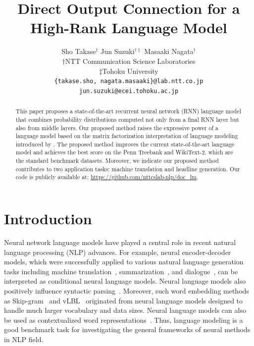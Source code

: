 \documentclass[11pt,a4paper]{article}
\title{Direct Output Connection for a High-Rank Language Model}
\author{Sho Takase$^\dagger$ \hspace{1.5em} Jun Suzuki$^{\dagger \ddagger}$ \hspace{1.5em} Masaaki Nagata$^\dagger$ \\
  $\dagger$NTT Communication Science Laboratories \\ $\ddagger$Tohoku University \\
  {\tt \{takase.sho, nagata.masaaki\}@lab.ntt.co.jp}  \\ { \tt jun.suzuki@ecei.tohoku.ac.jp}
  }
\date{}
\begin{document}
\maketitle
\begin{abstract}
  This paper proposes a state-of-the-art recurrent neural network (RNN) language model that combines probability distributions computed not only from a final RNN layer but also from middle layers.
  Our proposed method raises the expressive power of a language model based on the matrix factorization interpretation of language modeling introduced by \protect{}.
  The proposed method improves the current state-of-the-art language model and achieves the best score on the Penn Treebank and WikiText-2, which are the standard benchmark datasets.
  Moreover, we indicate our proposed method contributes to two application tasks: machine translation and headline generation.
  Our code is publicly available at: \href{https://github.com/nttcslab-nlp/doc_lm}{https://github.com/nttcslab-nlp/doc\_lm}.
\end{abstract}



\section{Introduction}
\label{sec:intro}
Neural network language models have played a central role in recent natural language processing (NLP) advances.
For example, neural encoder-decoder models, which were successfully applied to various natural language generation tasks including machine translation~\cite{Sutskever:2014:SSL:2969033.2969173}, summarization~\cite{rush-chopra-weston:2015:EMNLP}, and dialogue~\cite{wen-EtAl:2015:EMNLP}, can be interpreted as conditional neural language models.
Neural language models also positively influence syntactic parsing~\cite{dyer-EtAl:2016:N16-1,choe-charniak:2016:EMNLP2016}.
Moreover, such word embedding methods as Skip-gram~\cite{NIPS2013_5021} and vLBL~\cite{NIPS2013_5165} originated from neural language models designed to handle much larger vocabulary and data sizes.
Neural language models can also be used as contextualized word representations~\cite{N18-1202}.
Thus, language modeling is a good benchmark task for investigating the general frameworks of neural methods in NLP field.
\end{document}
